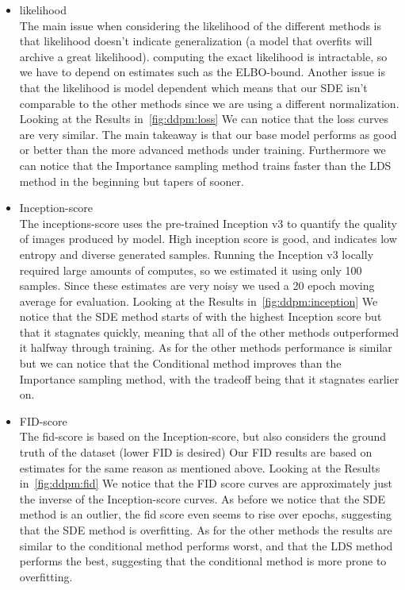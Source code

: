 \begin{itemize}
    \item likelihood\\
    The main issue when considering the likelihood of the different methods is that likelihood doesn't indicate generalization (a model that overfits will archive a great likelihood).
    computing the exact likelihood is intractable, so we have to depend on estimates such as the ELBO-bound. Another issue is that the likelihood is model dependent which means that our SDE isn't comparable to the other methods since we are using a different normalization.\\
    Looking at the Results in~\cref{fig:ddpm:loss} 
    We can notice that the loss curves are very similar.
    The main takeaway is that our base model performs as good or better than the more advanced methods under training.
    Furthermore we can notice that the Importance sampling method trains faster than the LDS method in the beginning but tapers of sooner. 
     
    \item Inception-score\\
    The inceptions-score uses the pre-trained Inception v3 to quantify the quality of images produced by model.
    High inception score is good, and indicates low entropy and diverse generated samples.
    Running the Inception v3 locally required large amounts of computes, so we estimated it using only 100 samples.
    Since these estimates are very noisy we used a 20 epoch moving average for evaluation.
    Looking at the Results in~\cref{fig:ddpm:inception}
    We notice that the SDE method starts of with the highest Inception score but that it stagnates quickly, meaning that all of the other methods outperformed it halfway through training.
    As for the other methods performance is similar but we can notice that the Conditional method improves than the Importance sampling method, with the tradeoff being that it stagnates earlier on.   
    
    \item FID-score\\
    The fid-score is based on the Inception-score, but also considers the ground truth of the dataset (lower FID is desired) Our FID results are based on estimates for the same reason as mentioned above.
    Looking at the Results in~\cref{fig:ddpm:fid}
    We notice that the FID score curves are approximately just the inverse of the Inception-score curves. As before we notice that the SDE method is an outlier, the fid score even seems to rise over epochs, suggesting that the SDE method is overfitting.
    As for the other methods the results are similar to the conditional method performs worst, and that the LDS method performs the best, suggesting that the conditional method is more prone to overfitting.
\end{itemize}
